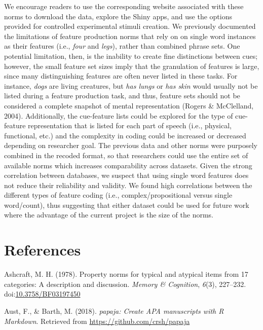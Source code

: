 \documentclass[english,,man]{apa6}
\begin{document}
We encourage readers to use the corresponding website associated with these norms to download the data, explore the Shiny apps, and use the options provided for controlled experimental stimuli creation. We previously documented the limitations of feature production norms that rely on on single word instances as their features (i.e., \emph{four} and \emph{legs}), rather than combined phrase sets. One potential limitation, then, is the inability to create fine distinctions between cues; however, the small feature set sizes imply that the granulation of features is large, since many distinguishing features are often never listed in these tasks. For instance, \emph{dogs} are living creatures, but \emph{has lungs} or \emph{has skin} would usually not be listed during a feature production task, and thus, feature sets should not be considered a complete snapshot of mental representation (Rogers \& McClelland, 2004). Additionally, the cue-feature lists could be explored for the type of cue-feature representation that is listed for each part of speech (i.e., physical, functional, etc.) and the complexity in coding could be increased or decreased depending on researcher goal. The previous data and other norms were purposely combined in the recoded format, so that researchers could use the entire set of available norms which increases comparability across datasets. Given the strong correlation between databases, we suspect that using single word features does not reduce their reliability and validity. We found high correlations between the different types of feature coding (i.e., complex/propositional versus single word/count), thus suggesting that either dataset could be used for future work where the advantage of the current project is the size of the norms.

\newpage

\hypertarget{references}{%
\section{References}\label{references}}

\setlength{\parindent}{-0.5in}
\setlength{\leftskip}{0.5in}

\hypertarget{refs}{}
\leavevmode\hypertarget{ref-Ashcraft1978a}{}%
Ashcraft, M. H. (1978). Property norms for typical and atypical items from 17 categories: A description and discussion. \emph{Memory \& Cognition}, \emph{6}(3), 227--232. doi:\href{https://doi.org/10.3758/BF03197450}{10.3758/BF03197450}

\leavevmode\hypertarget{ref-R-papaja}{}%
Aust, F., \& Barth, M. (2018). \emph{papaja: Create APA manuscripts with R Markdown}. Retrieved from \url{https://github.com/crsh/papaja}
\end{document}
